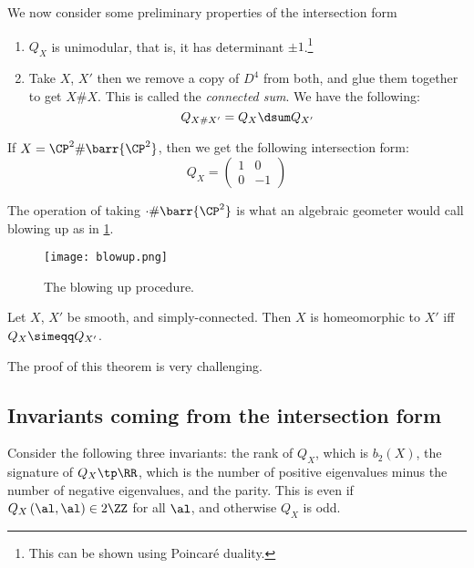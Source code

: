 \documentclass{amsart}
\begin{document}
We now consider some preliminary properties of the intersection form

\begin{thm}
\begin{enumerate}
\item $Q_X$ is unimodular, that is, it has determinant $\pm 1$.\footnote{
This can be shown using Poincar\'e duality.}
\item Take $X$, $X'$ then we remove a copy of $D^4$ from both, and glue them together to get
$X\# X$. This is called the \emph{connected sum}.
We have the following:
\begin{equation}
Q_{X\# X'} = Q_X \dsum Q_{X'}
\end{equation}
\end{enumerate}
\end{thm}

\begin{exm}
If $X = \CP^2 \# \barr{\CP^2}$, then we get the following intersection form:
\begin{equation}
Q_X = 
\begin{pmatrix}
1 & 0 \\ 0 &-1
\end{pmatrix}
\end{equation}
\end{exm}

\begin{rmk}
The operation of taking $\cdot \# \barr{\CP^2}$ is what an algebraic geometer would call blowing up
as in \cref{fig:blowing_up}.
\begin{figure}
\centering
\texttt{[image: blowup.png]}
\caption{The blowing up procedure.}
\label{fig:blowing_up}
\end{figure}
\end{rmk}

\begin{thm}[Freedman]
Let $X$, $X'$ be smooth, and simply-connected.
Then $X$ is homeomorphic to $X'$ iff $Q_X \simeqq Q_{X'}$.
\end{thm}

The proof of this theorem is very challenging. 

\subsection{Invariants coming from the intersection form}

Consider the following three invariants:
the rank of $Q_X$, which is $b_2\left( X \right)$, 
the signature of $Q_X\tp \RR$, which is the number of positive eigenvalues 
minus the number of negative eigenvalues, 
and the parity. This is even if $Q_X\left( \al , \al  \right)\in 2\ZZ$ for all $\al$, 
and otherwise $Q_X$ is odd.
\end{document}
